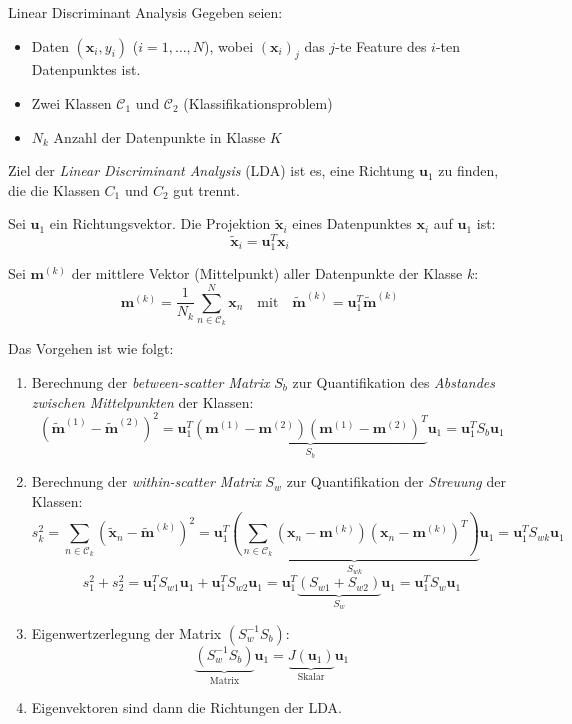 \begin{defi}{Linear Discriminant Analysis}
    Gegeben seien:
    \begin{itemize}
        \item Daten $(\mathbf{x}_i, y_i)$ ($i=1,\ldots,N$), wobei $(\mathbf{x}_i)_j$ das $j$-te Feature des $i$-ten Datenpunktes ist.
        \item Zwei Klassen $\mathcal{C}_1$ und $\mathcal{C}_2$ (Klassifikationsproblem)
        \item $N_k$ Anzahl der Datenpunkte in Klasse $K$
    \end{itemize}

    Ziel der \emph{Linear Discriminant Analysis} (LDA) ist es, eine Richtung $\mathbf{u}_1$ zu finden, die die Klassen $C_1$ und $C_2$ gut trennt.

    Sei $\mathbf{u}_1$ ein Richtungsvektor.
    Die Projektion $\tilde{\mathbf{x}}_i$ eines Datenpunktes $\mathbf{x}_i$ auf $\mathbf{u}_1$ ist:
    \[
        \tilde{\mathbf{x}}_i = \mathbf{u}_1^T \mathbf{x}_i
    \]

    Sei $\mathbf{m}^{(k)}$ der mittlere Vektor (Mittelpunkt) aller Datenpunkte der Klasse $k$:
    \[
        \mathbf{m}^{(k)} = \frac{1}{N_k} \sum_{n \in \mathcal{C}_k}^N \mathbf{x}_n \quad \text{mit} \quad \tilde{\mathbf{m}}^{(k)} = \mathbf{u}_1^T \tilde{\mathbf{m}}^{(k)}
    \]

    Das Vorgehen ist wie folgt:
    \begin{enumerate}
        \item Berechnung der \emph{between-scatter Matrix} $S_{b}$ zur Quantifikation des \emph{Abstandes zwischen Mittelpunkten} der Klassen:
              \[
                  (\tilde{\mathbf{m}}^{(1)} - \tilde{\mathbf{m}}^{(2)})^2 = \mathbf{u}_1^T \underbrace{(\mathbf{m}^{(1)} - \mathbf{m}^{(2)}) (\mathbf{m}^{(1)} - \mathbf{m}^{(2)})^T}_{S_b} \mathbf{u}_1 = \mathbf{u}_1^T S_b \mathbf{u}_1
              \]
        \item Berechnung der \emph{within-scatter Matrix} $S_{w}$ zur Quantifikation der \emph{Streuung} der Klassen:
              \[
                  s_k^2 = \sum_{n \in \mathcal{C}_k} \left( \tilde{\mathbf{x}}_n - \tilde{\mathbf{m}}^{(k)} \right)^2 = \mathbf{u}_1^T \underbrace{\left( \sum_{n \in \mathcal{C}_k} (\mathbf{x}_n - \mathbf{m}^{(k)}) (\mathbf{x}_n - \mathbf{m}^{(k)})^T \right) }_{S_{wk}} \mathbf{u}_1 = \mathbf{u}_1^T S_{wk} \mathbf{u}_1
              \]
              \[
                  s_1^2 + s_2^2 = \mathbf{u}_1^T S_{w1} \mathbf{u}_1 + \mathbf{u}_1^T S_{w2} \mathbf{u}_1 = \mathbf{u}_1^T \underbrace{(S_{w1} + S_{w2})}_{S_w} \mathbf{u}_1  = \mathbf{u}_1^T S_w \mathbf{u}_1
              \]
        \item Eigenwertzerlegung der Matrix $(S_w^{-1}S_b)$:
              \[
                  \underbrace{(S_w^{-1}S_b)}_{\text{Matrix}} \mathbf{u}_1 = \underbrace{J(\mathbf{u}_1)}_{\text{Skalar}} \mathbf{u}_1
              \]
        \item Eigenvektoren sind dann die Richtungen der LDA.
    \end{enumerate}


\end{defi}
